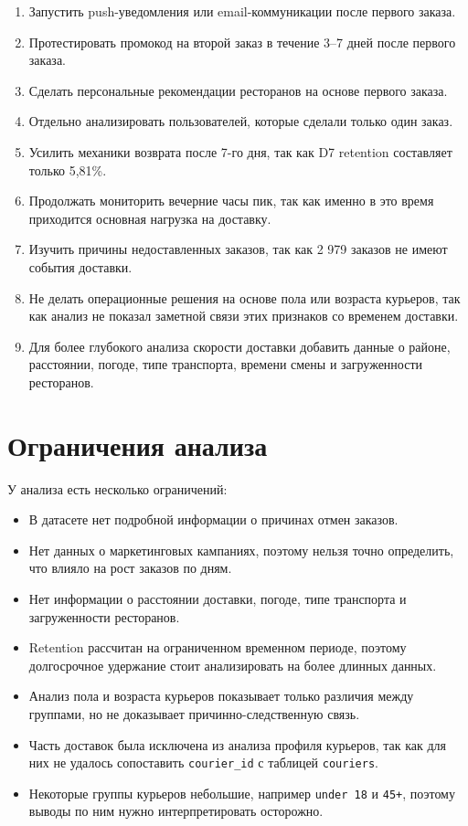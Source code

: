 \documentclass[12pt,a4paper]{article}
\begin{document}
\begin{enumerate}
    \item Запустить push-уведомления или email-коммуникации после первого заказа.
    \item Протестировать промокод на второй заказ в течение 3--7 дней после первого заказа.
    \item Сделать персональные рекомендации ресторанов на основе первого заказа.
    \item Отдельно анализировать пользователей, которые сделали только один заказ.
    \item Усилить механики возврата после 7-го дня, так как D7 retention составляет только 5,81\%.
    \item Продолжать мониторить вечерние часы пик, так как именно в это время приходится основная нагрузка на доставку.
    \item Изучить причины недоставленных заказов, так как 2 979 заказов не имеют события доставки.
    \item Не делать операционные решения на основе пола или возраста курьеров, так как анализ не показал заметной связи этих признаков со временем доставки.
    \item Для более глубокого анализа скорости доставки добавить данные о районе, расстоянии, погоде, типе транспорта, времени смены и загруженности ресторанов.
\end{enumerate}

\newpage
\section{Ограничения анализа}

У анализа есть несколько ограничений:

\begin{itemize}
    \item В датасете нет подробной информации о причинах отмен заказов.
    \item Нет данных о маркетинговых кампаниях, поэтому нельзя точно определить, что влияло на рост заказов по дням.
    \item Нет информации о расстоянии доставки, погоде, типе транспорта и загруженности ресторанов.
    \item Retention рассчитан на ограниченном временном периоде, поэтому долгосрочное удержание стоит анализировать на более длинных данных.
    \item Анализ пола и возраста курьеров показывает только различия между группами, но не доказывает причинно-следственную связь.
    \item Часть доставок была исключена из анализа профиля курьеров, так как для них не удалось сопоставить \texttt{courier\_id} с таблицей \texttt{couriers}.
    \item Некоторые группы курьеров небольшие, например \texttt{under 18} и \texttt{45+}, поэтому выводы по ним нужно интерпретировать осторожно.
\end{itemize}
\end{document}
